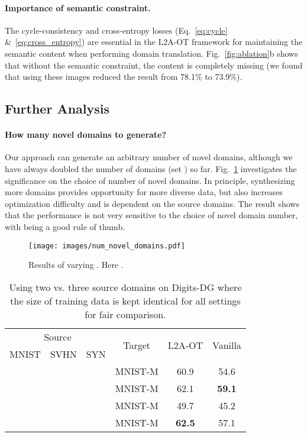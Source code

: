 \documentclass[runningheads]{llncs}
\begin{document}
\paragraph{Importance of semantic constraint.}
The cycle-consistency and cross-entropy losses (Eq.~\eqref{eq:cycle} \&~\eqref{eq:cross_entropy}) are essential in the L2A-OT framework for maintaining the semantic content when performing domain translation. Fig.~\ref{fig:ablation}b shows that without the semantic constraint, the content is completely missing (we found that using these images reduced the result from 78.1\% to 73.9\%).

\subsection{Further Analysis}

\paragraph{How many novel domains to generate?}
Our approach can generate an arbitrary number of novel domains, although we have always doubled the number of domains (set ) so far. Fig.~\ref{fig:num_novel_domains} investigates the significance on the choice of number of novel domains. In principle, synthesizing more domains provides opportunity for more diverse data, but also increases optimization difficulty and is dependent on the source domains. The result shows that the performance is not very sensitive to the choice of novel domain number, with  being a good rule of thumb.

\begin{figure}[t]
    \centering
    \texttt{[image: images/num\_novel\_domains.pdf]}
    \caption{Results of varying . Here .}
    \label{fig:num_novel_domains}
\end{figure}

\begin{table}[t]
\tabstyle{8pt}
\begin{tabular}{c c c | c | c c}
\hline
\multicolumn{3}{c|}{Source} & \multirow{2}{*}{Target} & \multirow{2}{*}{L2A-OT} & \multirow{2}{*}{Vanilla} \\
MNIST & SVHN & SYN & & & \\
\hline
 &  & & MNIST-M & 60.9 & 54.6 \\
 & &  & MNIST-M & 62.1 & \textbf{59.1} \\
 &  &  & MNIST-M & 49.7 & 45.2 \\
\hline
 &  &  & MNIST-M & \textbf{62.5} & 57.1 \\
\hline
\end{tabular}
\caption{Using two vs. three source domains on Digits-DG where the size of training data is kept identical for all settings for fair comparison.}
\label{tab:two_vs_three_src_dom}
\end{table}
\end{document}
